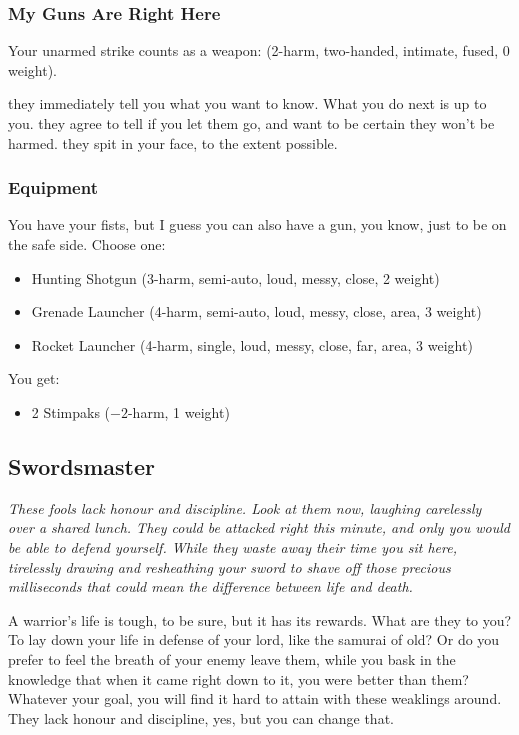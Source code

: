 \subsubsection{My Guns Are Right Here}
Your unarmed strike counts as a weapon: (2-harm, two-handed, intimate, fused, 0 weight).


{they immediately tell you what you want to know. What you do next is up to you.}
{they agree to tell if you let them go, and want to be certain they won't be harmed.}
{they spit in your face, to the extent possible.}


\subsubsection{Equipment}
You have your fists, but I guess you can also have a gun, you know, just to be on the safe side. Choose one:
\begin{itemize}
\item Hunting Shotgun (3-harm, semi-auto, loud, messy, close, 2 weight)
\item Grenade Launcher (4-harm, semi-auto, loud, messy, close, area, 3 weight)
\item Rocket Launcher (4-harm, single, loud, messy, close, far, area, 3 weight)
\end{itemize}

You get:
\begin{itemize}
\item 2 Stimpaks ($-2$-harm, 1 weight)
\end{itemize}



\subsection{Swordsmaster}
{\itshape These fools lack honour and discipline. Look at them now, laughing carelessly over a shared lunch. They could be attacked right this minute, and only you would be able to defend yourself. While they waste away their time you sit here, tirelessly drawing and resheathing your sword to shave off those precious milliseconds that could mean the difference between life and death.

A warrior's life is tough, to be sure, but it has its rewards. What are they to you? To lay down your life in defense of your lord, like the samurai of old? Or do you prefer to feel the breath of your enemy leave them, while you bask in the knowledge that when it came right down to it, you were better than them? Whatever your goal, you will find it hard to attain with these weaklings around. They lack honour and discipline, yes, but you can change that.}

